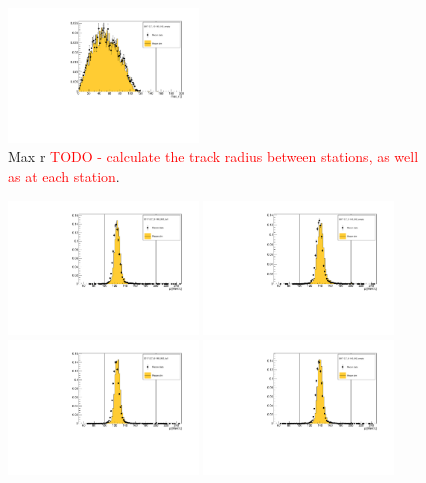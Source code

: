 \begin{figure}[!tbh]
    \includegraphics*[width=0.45\textwidth]{02-Cuts/Figures/2017-2.7_10-140_lH2_empty/tkd_max_r_ds_cut.pdf}
    \caption{Max r  \textcolor{red}{TODO - calculate the track radius between stations, as well as at each station}.
\label{fig:tkd_max_r}}
\end{figure}

\begin{figure}[!tbh]
    \centering
    \includegraphics*[width=0.45\textwidth]{02-Cuts/Figures/2017-2.7_3-140_lH2_full/tkd_p_ds_cut.pdf}
    \includegraphics*[width=0.45\textwidth]{02-Cuts/Figures/2017-2.7_3-140_lH2_empty/tkd_p_ds_cut.pdf}
    \includegraphics*[width=0.45\textwidth]{02-Cuts/Figures/2017-2.7_6-140_lH2_full/tkd_p_ds_cut.pdf}
    \includegraphics*[width=0.45\textwidth]{02-Cuts/Figures/2017-2.7_6-140_lH2_empty/tkd_p_ds_cut.pdf}

\end{figure}
